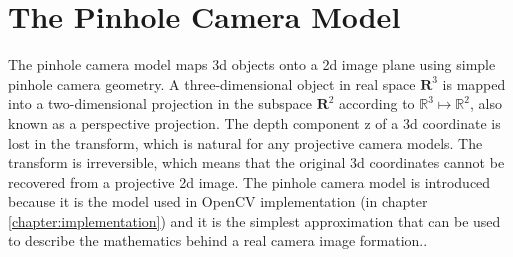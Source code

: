 \documentclass[12pt,a4paper,oneside,pdftex]{report}
\begin{document}
{\section{The Pinhole Camera Model}
\label{section:the_pinhole_camera_model}

The pinhole camera model maps 3d objects onto a 2d image plane using simple pinhole camera geometry. A three-dimensional object in real space $\mathbf{R}^3$ is mapped into a two-dimensional projection in the subspace $\mathbf{R}^2$ according to $\mathbb{R}^3 \mapsto \mathbb{R}^2$, also known as a perspective projection. The depth component z of a 3d coordinate is lost in the transform, which is natural for any projective camera models. The transform is irreversible, which means that the original 3d coordinates cannot be recovered from a projective 2d image. The pinhole camera model is introduced because it is the model used in OpenCV implementation (in chapter \ref{chapter:implementation}) and it is the simplest approximation that can be used to describe the mathematics behind a real camera image formation.\citep{Sonka07, OpenCVWeb}.


}
\end{document}
